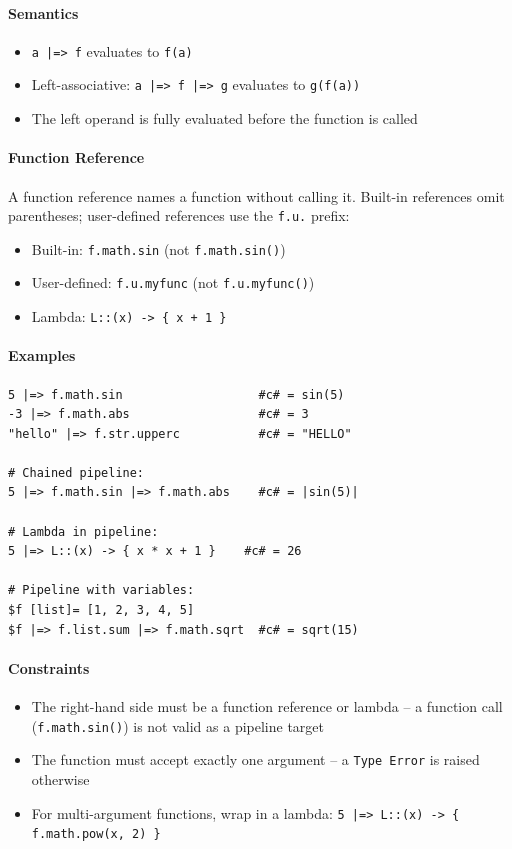 \paragraph{Semantics}
\begin{itemize}
\item \texttt{a |=> f} evaluates to \texttt{f(a)}
\item Left-associative: \texttt{a |=> f |=> g} evaluates to \texttt{g(f(a))}
\item The left operand is fully evaluated before the function is called
\end{itemize}

\paragraph{Function Reference}
A function reference names a function without calling it. Built-in references omit parentheses; user-defined references use the \texttt{f.u.} prefix:
\begin{itemize}
\item Built-in: \texttt{f.math.sin} (not \texttt{f.math.sin()})
\item User-defined: \texttt{f.u.myfunc} (not \texttt{f.u.myfunc()})
\item Lambda: \texttt{L::(x) -> \{ x + 1 \}}
\end{itemize}

\paragraph{Examples}
\begin{verbatim}
5 |=> f.math.sin                   #c# = sin(5)
-3 |=> f.math.abs                  #c# = 3
"hello" |=> f.str.upperc           #c# = "HELLO"

# Chained pipeline:
5 |=> f.math.sin |=> f.math.abs    #c# = |sin(5)|

# Lambda in pipeline:
5 |=> L::(x) -> { x * x + 1 }    #c# = 26

# Pipeline with variables:
$f [list]= [1, 2, 3, 4, 5]
$f |=> f.list.sum |=> f.math.sqrt  #c# = sqrt(15)
\end{verbatim}

\paragraph{Constraints}
\begin{itemize}
\item The right-hand side must be a function reference or lambda -- a function call (\texttt{f.math.sin()}) is not valid as a pipeline target
\item The function must accept exactly one argument -- a \texttt{Type Error} is raised otherwise
\item For multi-argument functions, wrap in a lambda: \texttt{5 |=> L::(x) -> \{ f.math.pow(x, 2) \}}
\end{itemize}

